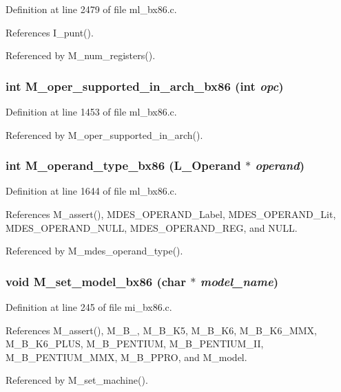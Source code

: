 Definition at line 2479 of file ml\_\-bx86.c.

References I\_\-punt().

Referenced by M\_\-num\_\-registers().
\subsubsection{\setlength{\rightskip}{0pt plus 5cm}int M\_\-oper\_\-supported\_\-in\_\-arch\_\-bx86 (int {\em opc})}\label{m__bx86_8h_ed6d1eee3749d099ff2cca1ab122039e}




Definition at line 1453 of file ml\_\-bx86.c.

Referenced by M\_\-oper\_\-supported\_\-in\_\-arch().
\subsubsection{\setlength{\rightskip}{0pt plus 5cm}int M\_\-operand\_\-type\_\-bx86 (L\_\-Operand $\ast$ {\em operand})}\label{m__bx86_8h_7d2d535b02535f95ace9a15d621fc39c}




Definition at line 1644 of file ml\_\-bx86.c.

References M\_\-assert(), MDES\_\-OPERAND\_\-Label, MDES\_\-OPERAND\_\-Lit, MDES\_\-OPERAND\_\-NULL, MDES\_\-OPERAND\_\-REG, and NULL.

Referenced by M\_\-mdes\_\-operand\_\-type().
\subsubsection{\setlength{\rightskip}{0pt plus 5cm}void M\_\-set\_\-model\_\-bx86 (char $\ast$ {\em model\_\-name})}\label{m__bx86_8h_e7640e6dc2ce31d051f35a6aa4c1371c}




Definition at line 245 of file mi\_\-bx86.c.

References M\_\-assert(), M\_\-B\_, M\_\-B\_\-K5, M\_\-B\_\-K6, M\_\-B\_\-K6\_\-MMX, M\_\-B\_\-K6\_\-PLUS, M\_\-B\_\-PENTIUM, M\_\-B\_\-PENTIUM\_\-II, M\_\-B\_\-PENTIUM\_\-MMX, M\_\-B\_\-PPRO, and M\_\-model.

Referenced by M\_\-set\_\-machine().